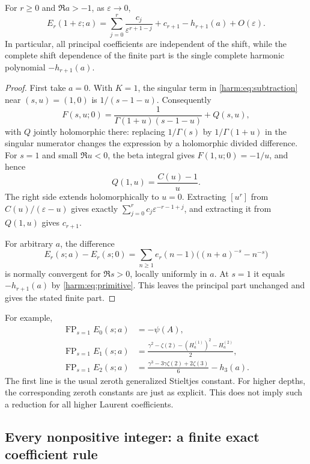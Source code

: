 \begin{theorem}\label{harm:thm:one}
For $r\geq0$ and $\Re a>-1$, as $\varepsilon\to0$,
\begin{equation}\label{harm:eq:one}
 \boxed{\quad
 E_r(1+\varepsilon;a)
 =\sum_{j=0}^{r}\frac{c_j}{\varepsilon^{r+1-j}}
       +c_{r+1}-h_{r+1}(a)+O(\varepsilon).
 \quad}
\end{equation}
In particular, all principal coefficients are independent of the
shift, while the complete shift dependence of the finite part is
the single complete harmonic polynomial $-h_{r+1}(a)$.
\end{theorem}
\begin{proof}
First take $a=0$.  With $K=1$, the singular term in
\eqref{harm:eq:subtraction} near $(s,u)=(1,0)$ is $1/(s-1-u)$.
Consequently
\[
 F(s,u;0)=\frac{1}{\Gamma(1+u)(s-1-u)}+Q(s,u),
\]
with $Q$ jointly holomorphic there: replacing $1/\Gamma(s)$ by
$1/\Gamma(1+u)$ in the singular numerator changes the expression
by a holomorphic divided difference.  For $s=1$ and small
$\Re u<0$, the beta integral gives $F(1,u;0)=-1/u$, and hence
\[
 Q(1,u)=\frac{C(u)-1}{u}.
\]
The right side extends holomorphically to $u=0$.  Extracting
$[u^r]$ from $C(u)/(\varepsilon-u)$ gives exactly
$\sum_{j=0}^{r}c_j\varepsilon^{-r-1+j}$, and extracting it from
$Q(1,u)$ gives $c_{r+1}$.

For arbitrary $a$, the difference
\[
 E_r(s;a)-E_r(s;0)
   =\sum_{n\geq1}e_r(n-1)
               \bigl((n+a)^{-s}-n^{-s}\bigr)
\]
is normally convergent for $\Re s>0$, locally uniformly in $a$.
At $s=1$ it equals $-h_{r+1}(a)$ by
\eqref{harm:eq:primitive}.  This leaves the principal part unchanged
and gives the stated finite part.
\end{proof}

For example,
\begin{align}
 \operatorname{FP}_{s=1}E_0(s;a)&=-\psi(A),\\
 \operatorname{FP}_{s=1}E_1(s;a)
 &=\frac{\gamma^2-\zeta(2)-(H_a^{(1)})^2-H_a^{(2)}}2,\\
 \operatorname{FP}_{s=1}E_2(s;a)
 &=\frac{\gamma^3-3\gamma\zeta(2)+2\zeta(3)}6-h_3(a).
\end{align}
The first line is the usual zeroth generalized Stieltjes constant.
For higher depths, the corresponding zeroth constants are just as
explicit.  This does not imply such a reduction for all higher
Laurent coefficients.

\subsection{Every nonpositive integer: a finite exact coefficient rule}

